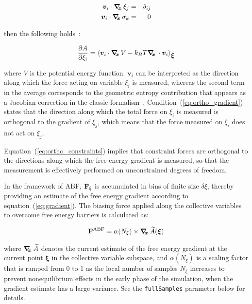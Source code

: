 \begin{eqnarray}
\label{eq:ortho_gradient}
{\mbox{\boldmath{$v$}}}_{i} \cdot \mbox{\boldmath$\nabla_{\!\!x}\,$} \xi_{j}    & = & \delta_{ij}\\
\label{eq:ortho_constraints}
{\mbox{\boldmath{$v$}}}_{i} \cdot \mbox{\boldmath$\nabla_{\!\!x}\,$} \sigma_{k} & = & 0
\end{eqnarray}

then the following holds~\cite{Ciccotti2005}:

\begin{equation}
\label{eq:gradient_vector}
\frac{\partial A}{\partial \xi_{i}} = \left\langle {\mbox{\boldmath{$v$}}}_{i} \cdot \mbox{\boldmath$\nabla_{\!\!x}\,$} V
- k_B T \mbox{\boldmath$\nabla_{\!\!x}\,$} \cdot {\mbox{\boldmath{$v$}}}_{i} \right\rangle_{{\mbox{\boldmath{$\xi$}}}}
\end{equation}

where $V$ is the potential energy function.
$\bm{v}_{i}$ can be interpreted as the direction along which the force
acting on variable $\xi_{i}$ is measured, whereas the second term in the
average corresponds to the geometric entropy contribution that appears
as a Jacobian correction in the classic formalism~\cite{Carter1989}.
Condition~(\ref{eq:ortho_gradient}) states that the direction along
which the total force on $\xi_{i}$ is measured is orthogonal to the
gradient of $\xi_{j}$, which means that the force measured on $\xi_{i}$
does not act on $\xi_{j}$.

Equation~(\ref{eq:ortho_constraints}) implies that constraint forces
are orthogonal to the directions along which the free energy gradient is
measured, so that the measurement is effectively performed on unconstrained
degrees of freedom.

In the framework of ABF,
${\bf F}_\xi$ is accumulated in bins of finite size $\delta \xi$,
thereby providing an estimate of the free energy gradient
according to equation~({\ref{eq:gradient}}).
The biasing force applied along the collective variables
to overcome free energy barriers is calculated as:

\begin{equation}
  \label{eq:abf}
  {\bf F}^{\rm ABF} = \alpha(N_\xi) \times \mbox{\boldmath$\nabla_{\!\!x}\,$} \widetilde A({\mbox{\boldmath{$\xi$}}})
\end{equation}

where $\mbox{\boldmath$\nabla_{\!\!x}\,$} \widetilde A$ denotes the current estimate of the
free energy gradient at the current point $\bm{\xi}$ in the collective
variable subspace, and $\alpha(N_\xi)$ is a scaling factor that is ramped
from 0 to 1 as the local number of samples $N_\xi$ increases
to prevent nonequilibrium effects in the early phase of the simulation,
when the gradient estimate has a large variance.
See the \texttt{fullSamples} parameter below for details.

